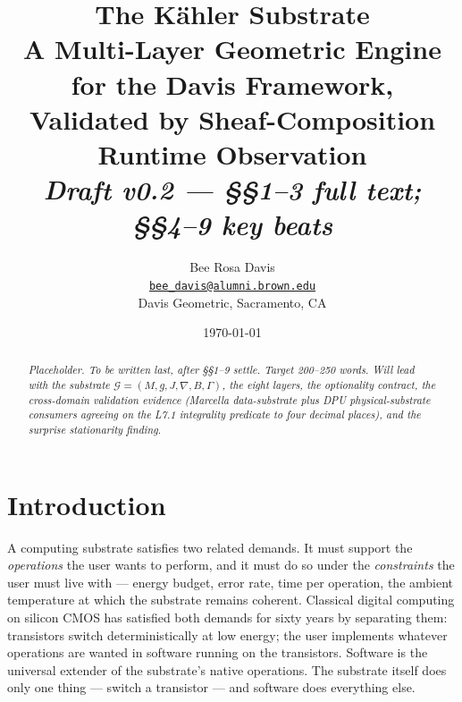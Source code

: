 \documentclass[11pt,letterpaper]{article}
\title{\textbf{The K\"ahler Substrate} \\[6pt]
\large A Multi-Layer Geometric Engine for the Davis Framework, \\
Validated by Sheaf-Composition Runtime Observation \\[10pt]
\normalsize \emph{Draft v0.2 --- \S\S1--3 full text; \S\S4--9 key beats}}
\author{Bee Rosa Davis \\
\href{mailto:bee_davis@alumni.brown.edu}{\nolinkurl{bee_davis@alumni.brown.edu}} \\
Davis Geometric, Sacramento, CA}
\date{\today}
\begin{document}
\maketitle

\noindent{}

\bigskip

\begin{abstract}
\noindent\emph{Placeholder. To be written last, after \S\S1--9 settle.
Target 200--250 words. Will lead with the substrate
$\mathcal{G} = (M, g, J, \nabla, B, \Gamma)$, the eight layers, the
optionality contract, the cross-domain validation evidence (Marcella
data-substrate plus DPU physical-substrate consumers agreeing on the
L7.1 integrality predicate to four decimal places), and the surprise
stationarity finding.}
\end{abstract}

\tableofcontents
\bigskip


\section{Introduction}
\label{sec:intro}

A computing substrate satisfies two related demands. It must support
the \emph{operations} the user wants to perform, and it must do so
under the \emph{constraints} the user must live with --- energy
budget, error rate, time per operation, the ambient temperature at
which the substrate remains coherent. Classical digital computing on
silicon CMOS has satisfied both demands for sixty years by separating
them: transistors switch deterministically at low energy; the user
implements whatever operations are wanted in software running on the
transistors. Software is the universal extender of the substrate's
native operations. The substrate itself does only one thing --- switch
a transistor --- and software does everything else.
\end{document}
